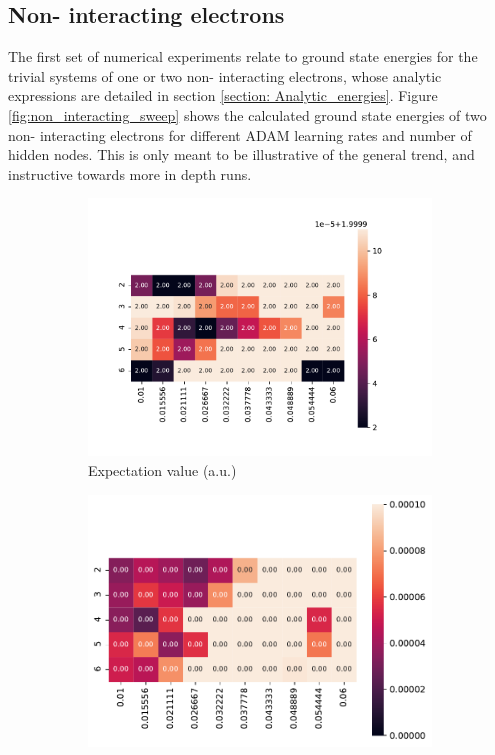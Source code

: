 \documentclass[11pt,a4paper,titlepage]{article}
\begin{document}
\subsection{Non- interacting electrons}
The first set of numerical experiments relate to ground state energies for the trivial systems of one or two non- interacting electrons, whose analytic expressions are detailed in section \ref{section: Analytic_energies}. Figure \ref{fig:non_interacting_sweep} shows the calculated ground state energies of two non- interacting electrons for different ADAM learning rates and number of hidden nodes. This is only meant to be illustrative of the general trend, and instructive towards more in depth runs.
\begin{figure}[H]

\begin{subfigure}{.5\textwidth}
\includegraphics[trim=2cm 0.9cm 2cm 0.9cm,scale = 0.6]{exp_val.pdf}
\caption{Expectation value (a.u.)}\label{J1}
\end{subfigure}%
\begin{subfigure}{.5\textwidth}
\includegraphics[trim=0cm 0.3cm 0cm 0.0cm,scale = 0.6]{std_dev.pdf}

\end{subfigure}
\end{figure}
\end{document}
